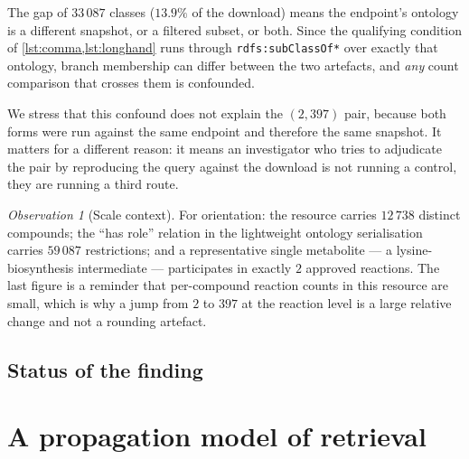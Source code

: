 \documentclass[11pt,a4paper]{article}
\theoremstyle{plain}
\theoremstyle{definition}
\theoremstyle{remark}
\newtheorem{observation}[theorem]{Observation}
\begin{document}
The gap of $33\,087$ classes ($13.9\%$ of the download) means the endpoint's
ontology is a different snapshot, or a filtered subset, or both. Since the
qualifying condition of \cref{lst:comma,lst:longhand} runs through
\texttt{rdfs:subClassOf*} over exactly that ontology, branch membership can
differ between the two artefacts, and \emph{any} count comparison that crosses
them is confounded.

We stress that this confound does not explain the $(2,397)$ pair, because both
forms were run against the same endpoint and therefore the same snapshot. It
matters for a different reason: it means an investigator who tries to adjudicate
the pair by reproducing the query against the download is not running a control,
they are running a third route.

\begin{observation}[Scale context]
For orientation: the resource carries $12\,738$ distinct compounds; the ``has
role'' relation in the lightweight ontology serialisation carries $59\,087$
restrictions; and a representative single metabolite --- a lysine-biosynthesis
intermediate --- participates in exactly $2$ approved reactions. The last figure
is a reminder that per-compound reaction counts in this resource are small,
which is why a jump from $2$ to $397$ at the reaction level is a large relative
change and not a rounding artefact.
\end{observation}

\subsection{Status of the finding}
\label{sec:status}

\begin{center}
\end{center}

\section{A propagation model of retrieval}
\label{sec:propagation}
\end{document}
